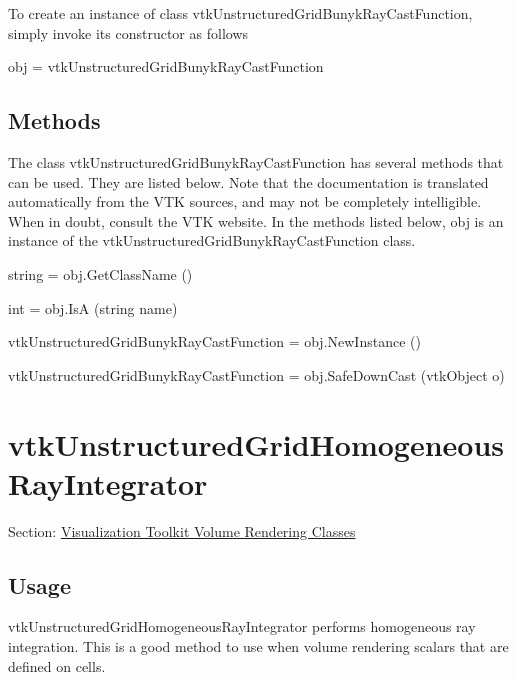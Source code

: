 To create an instance of class vtk\-Unstructured\-Grid\-Bunyk\-Ray\-Cast\-Function, simply invoke its constructor as follows \begin{DoxyVerb}  obj = vtkUnstructuredGridBunykRayCastFunction
\end{DoxyVerb}
 \hypertarget{vtkwidgets_vtkxyplotwidget_Methods}{}\subsection{Methods}\label{vtkwidgets_vtkxyplotwidget_Methods}
The class vtk\-Unstructured\-Grid\-Bunyk\-Ray\-Cast\-Function has several methods that can be used. They are listed below. Note that the documentation is translated automatically from the V\-T\-K sources, and may not be completely intelligible. When in doubt, consult the V\-T\-K website. In the methods listed below, {\ttfamily obj} is an instance of the vtk\-Unstructured\-Grid\-Bunyk\-Ray\-Cast\-Function class. 
\begin{DoxyItemize}
\item {\ttfamily string = obj.\-Get\-Class\-Name ()}  
\item {\ttfamily int = obj.\-Is\-A (string name)}  
\item {\ttfamily vtk\-Unstructured\-Grid\-Bunyk\-Ray\-Cast\-Function = obj.\-New\-Instance ()}  
\item {\ttfamily vtk\-Unstructured\-Grid\-Bunyk\-Ray\-Cast\-Function = obj.\-Safe\-Down\-Cast (vtk\-Object o)}  
\end{DoxyItemize}\hypertarget{vtkvolumerendering_vtkunstructuredgridhomogeneousrayintegrator}{}\section{vtk\-Unstructured\-Grid\-Homogeneous\-Ray\-Integrator}\label{vtkvolumerendering_vtkunstructuredgridhomogeneousrayintegrator}
Section\-: \hyperlink{sec_vtkvolumerendering}{Visualization Toolkit Volume Rendering Classes} \hypertarget{vtkwidgets_vtkxyplotwidget_Usage}{}\subsection{Usage}\label{vtkwidgets_vtkxyplotwidget_Usage}
vtk\-Unstructured\-Grid\-Homogeneous\-Ray\-Integrator performs homogeneous ray integration. This is a good method to use when volume rendering scalars that are defined on cells.

